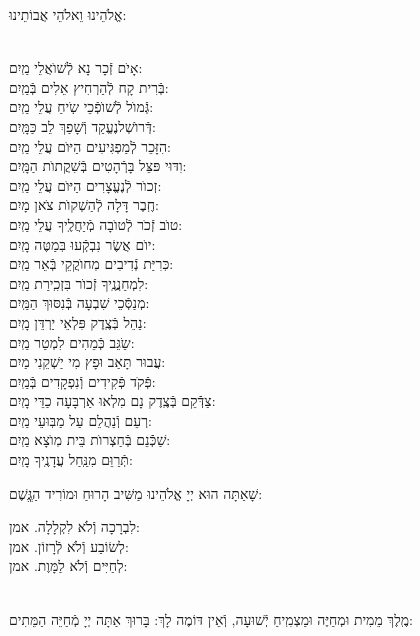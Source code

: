 \documentclass[twoside, openany, parskip=half, 11pt]{book}
\begin{document}
\begin{sometimes}
\begin{small}אֱלֹהֵינוּ וֵאלֹהֵי אֲבוֹתֵינוּ:\end{small}\\
אָיׂם זְֿכָר נָא לְֿשׁוׂאֲלֵי \hfill מַֽיִם:\\
בְּֿרִית קָח לְֿהַרְחִיץ אֵלִים \hfill בְּֿמַֽיִם:\\
גְּֿמוׂל לְֿשׁוׂפְֿכֵי שִֹֽיחַ עֲלֵי \hfill מַֽיִם:\\
דְּֿרוׂשְׁלנֶעֱקַד וְֿשָׁפַךְ לֵב \hfill כַּמָּֽיִם:\\
הִזָּכֵר לְֿמַפְגִּיעִים הַיּוׂם עֲלֵי \hfill מַֽיִם:\\
וִדּוּי פּצֵּל בָּרְֿהָטִים בְּֿשִׁקֲתוׂת \hfill הַמָּֽיִם:\\
זְכוׂר לְֿנֶעֱצָרִים הַיּוׂם עֲלֵי \hfill מַֽיִם:\\
חֶֽבֶר דָּלָה לְֿהַשְׁקוׂת צׂאן \hfill מָיִם:\\
טוׂב זְֿכׂר לְֿטוׂבָה מְֿיַחֲלֶֽיךָ עֲלֵי \hfill מַֽיִם:\\
יוׂם אֲשֶׂר נִבְקְֿעוּ בּֽמַטֶּה \hfill מָֽיִם:\\
כּֽרִיַּת נְֿדִיבִים מֽחוׂקֲקֵי בְּֿאֵר \hfill מַֽיִם:\\
לִמְחַנֲנֶֽיךָ זְֿכוׂר בִּזְכִֽירַת \hfill מַֽיִם:\\
מְנַסְּֿכֵי שִׁבְעָה בְּֿנִסּוּךְ \hfill הַמַּֽיִם:\\
נַהֵל בְּֿצֶֽדֶק פִּלְאֵי יַרְדֵּן \hfill מָֽיִם:\\
שַֹגֵּב כְּֿמֵהִים לִמְטַר \hfill מַֽיִם:\\
עֲבוּר תָּאַב וּפָץ מִי יַשְׁקֵנִי \hfill מַיִם:\\
פְּֿקׂד פְּֿקִידִים וְֿנִפְקָדִים \hfill בְּֿמַֽיִם:\\
צַדְּֿֿקֵם בְּֿצֶֽדֶק נָם מִלְאוּ אַרְבָּעָה כַדֵּי \hfill מָֽיִם:\\
רְעֵם וְֿנַהֲלֵם עַל מַבּֽוּעֵי \hfill מַֽיִם:\\
שַׁכְּֿֿנֵם בְּֿחַצְרוׂת בֵּית מֽוׂצָא \hfill מַֽיִם:\\
תְּֿרַוֵּם מִנַּֽחַל עֲדָנֶֽיךָ \hfill מָֽיִם:

שָׁאַתָּה הוּא יְיָ אֱלֹהֵינוּ מַשִּׁיב הָרוּחַ וּמוֹרִיד הַגֱּֽשֶׁם:

לִבְרָכָה וְֿלֹא לִקְלָלָה. \hfill אמן:\\
לְשׂוֹבַע וְֿלֹא לְֿרָזוֹן. \hfill אמן:\\
לְחַיִּים וְֿלֹא לַמָּוֶת. \hfill אמן:

\\
 מֶֽלֶךְ מֵמִית וּמְחַיֶּה וּמַצְמִֽיחַ יְֿשׁוּעָה, וְֿאֵין דּוֹמֶה לָךְ: בָּרוּךְ אַתָּה יְיָ מְֿחַיֵּה הַמֵּתִים:


\end{sometimes}
\end{document}
